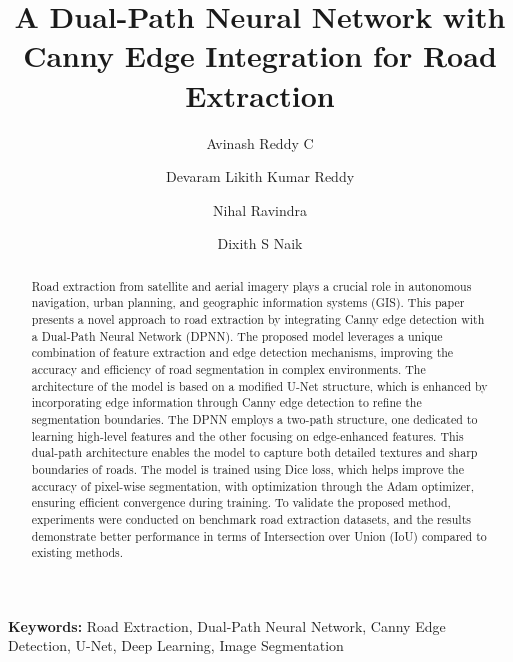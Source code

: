\documentclass[11pt]{article}
\title{\textbf{A Dual-Path Neural Network with Canny Edge Integration for Road Extraction
}}
\author[1]{Avinash Reddy C}
\author[2]{Devaram Likith Kumar Reddy}
\author[3]{Nihal Ravindra}
\author[4]{Dixith S Naik}
\affil[5]{Department of Information Science and Engineering}
\affil[6]{Jss Science And Technology University}
\date{}
\begin{document}
\maketitle

\begin{abstract}
Road extraction from satellite and aerial imagery plays a crucial role in autonomous navigation, urban planning, and geographic information systems (GIS). This paper presents a novel approach to road extraction by integrating Canny edge detection with a Dual-Path Neural Network (DPNN). The proposed model leverages a unique combination of feature extraction and edge detection mechanisms, improving the accuracy and efficiency of road segmentation in complex environments. The architecture of the model is based on a modified U-Net structure, which is enhanced by incorporating edge information through Canny edge detection to refine the segmentation boundaries. The DPNN employs a two-path structure, one dedicated to learning high-level features and the other focusing on edge-enhanced features. This dual-path architecture enables the model to capture both detailed textures and sharp boundaries of roads. The model is trained using Dice loss, which helps improve the accuracy of pixel-wise segmentation, with optimization through the Adam optimizer, ensuring efficient convergence during training. To validate the proposed method, experiments were conducted on benchmark road extraction datasets, and the results demonstrate better performance in terms of Intersection over Union (IoU) compared to existing methods.
\end{abstract}

\vspace{0.5em}
\noindent\textbf{Keywords:} Road Extraction, Dual-Path Neural Network, Canny Edge Detection, U-Net, Deep Learning, Image Segmentation
\end{document}

